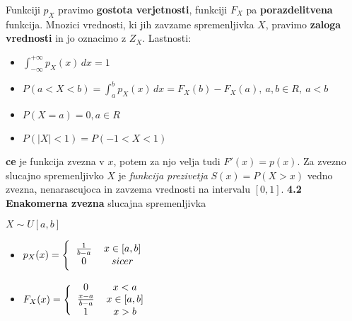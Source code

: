 \documentclass{article}
\begin{document}
\begin{multicols}{2}
	Funkciji $p_{X}$ pravimo \textbf{gostota verjetnosti}, funkciji $F_{X}$ pa
	\textbf{porazdelitvena} funkcija. Mnozici vrednosti, ki jih zavzame spremenljivka
	$X$, pravimo \textbf{zaloga vrednosti} in jo oznacimo z $Z_{X}$.
	Lastnosti:
	\begin{itemize}
		\item \begin{math}
			      \int_{- \infty}^{+ \infty} p_{X}(x) \,dx = 1
		      \end{math}
		\item \begin{math}
			      P(a < X < b) = \int_{a}^{b} p_{X}(x) \,dx = F_{X}(b) - F_{X}(a),\: a,b \in R,\: a < b
		      \end{math}
		\item \begin{math}
			      P(X = a) = 0, a \in R
		      \end{math}
		\item \begin{math}
			      P(|X| < 1) = P(-1 < X < 1)
		      \end{math}
	\end{itemize}
	\textbf{ce} je funkcija zvezna v $x$, potem za njo velja tudi $F'(x) = p(x)$.
	Za zvezno slucajno spremenljivko $X$ je \textit{funkcija prezivetja} $S(x) = P(X > x)$
	vedno zvezna, nenarascujoca in zavzema vrednosti na intervalu $[0, 1]$.
	\textbf{4.2 Enakomerna zvezna} slucajna spremenljivka
	\begin{center}
		\begin{math}
			X \sim U[a, b]
		\end{math}
	\end{center}

	\begin{itemize}
		\item  \begin{math}
			      p_{X}(x) =
			      \Bigg \{\begin{tabular}{ccc}
				      $\frac{1}{b-a}$ & $x \in [a, b]$ & \\
				      $0$             & $sicer$        & \\
			      \end{tabular}
		      \end{math}

		\item \begin{math}
			      F_{X}(x) =
			      \Bigg \{\begin{tabular}{ccc}
				      $0$                   & $x < a$        & \\
				      $\frac{x - a}{b - a}$ & $x \in [a, b]$ & \\
				      $1$                   & $x > b$        & \\
			      \end{tabular}
		      \end{math}
	\end{itemize}


\end{multicols}
\end{document}
